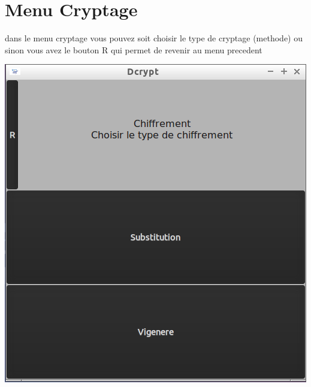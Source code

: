 \documentclass[a4]{article}
\begin{document}
	\section{Menu Cryptage}
		dans le menu cryptage vous pouvez soit choisir le type de cryptage (methode) ou 
		sinon vous avez le bouton R qui permet de revenir au menu precedent
		\begin{center}\includegraphics[scale=0.4]{2.png}\end{center}
\end{document}
